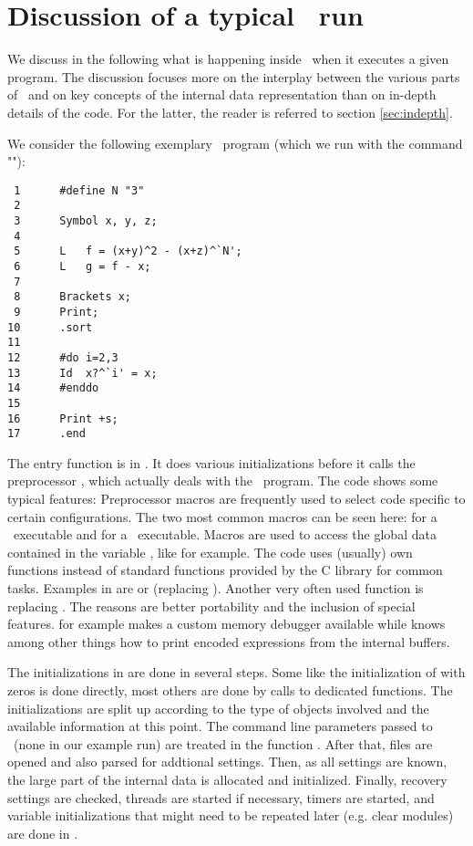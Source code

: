 \section{Discussion of a typical \FORM\ run}

We discuss in the following what is happening inside \FORM\ when it executes a given program. The
discussion focuses more on the interplay between the various parts of \FORM\ and on key concepts of
the internal data representation than on in-depth details of the code. For the
latter, the reader is 
referred to section \ref{sec:indepth}.

We consider the following exemplary \FORM\ program  (which we run
with the command ""):

\begin{verbatim}
 1      #define N "3"
 2      
 3      Symbol x, y, z;
 4      
 5      L	f = (x+y)^2 - (x+z)^`N';
 6      L	g = f - x;
 7      
 8      Brackets x;
 9      Print;
10      .sort
11      
12      #do i=2,3
13      Id	x?^`i' = x;
14      #enddo
15      
16      Print +s;
17      .end
\end{verbatim}

The entry function  is in . It does various
initializations before it calls the preprocessor , which
actually deals with the \FORM\ program. The code shows some typical features:
Preprocessor macros are frequently used to select code specific to certain
configurations. The two most common macros can be seen here: 
for a \TFORM\ executable and  for a \PARFORM\ executable. Macros are
used to access the global data contained in the variable , like 
 for example. The code uses (usually) own functions instead of
standard functions provided by the C library for common tasks. Examples in
 are  or  (replacing ). Another
very often used function is  replacing . The reasons
are better portability and the inclusion of special features.   for
example makes a custom memory debugger available while  knows
among other things how to print encoded expressions from the internal buffers.

The initializations in  are done in several steps. Some like the
initialization of  with zeros is done directly, most others are done by
calls to dedicated functions. The initializations are split up according to the
type of objects involved and the available information at this point. The
command line parameters passed to \FORM\ (none in our example run) are treated
in the function . After that, files are opened and also parsed for
addtional settings. Then, as all settings are known, the large part of the
internal data is allocated and initialized. Finally, recovery settings are
checked, threads are started if necessary, timers are started, and variable
initializations that might need to be repeated later (e.g. clear modules) are
done in .

